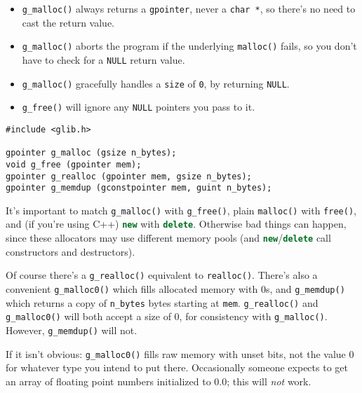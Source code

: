 \begin{itemize}
  \item \lstinline{g_malloc()} always returns a \lstinline{gpointer}, never a \lstinline{char *}, so there's no need to cast the return value.

  \item \lstinline{g_malloc()} aborts the program if the underlying \lstinline{malloc()} fails, so you don't have to check for a \lstinline{NULL} return value.

  \item \lstinline{g_malloc()} gracefully handles a \lstinline{size} of \lstinline{0}, by returning \lstinline{NULL}.

  \item \lstinline{g_free()} will ignore any \lstinline{NULL} pointers you pass to it.
\end{itemize}

\begin{lstlisting}[float, caption={GLib memory allocation}, label=glib-malloc-free]
#include <glib.h>

gpointer g_malloc (gsize n_bytes);
void g_free (gpointer mem);
gpointer g_realloc (gpointer mem, gsize n_bytes);
gpointer g_memdup (gconstpointer mem, guint n_bytes);
\end{lstlisting}

It's important to match \lstinline{g_malloc()} with \lstinline{g_free()}, plain \lstinline{malloc()} with \lstinline{free()}, and (if you're using C++) \lstinline[language=C++]{new} with \lstinline[language=C++]{delete}. Otherwise bad things can happen, since these allocators may use different memory pools (and \lstinline[language=C++]{new}/\lstinline[language=C++]{delete} call constructors and destructors).

Of course there's a \lstinline{g_realloc()} equivalent to \lstinline{realloc()}. There's also a convenient \lstinline{g_malloc0()} which fills allocated memory with 0s, and \lstinline{g_memdup()} which returns a copy of \lstinline{n_bytes} bytes starting at \lstinline{mem}. \lstinline{g_realloc()} and \lstinline{g_malloc0()} will both accept a size of 0, for consistency with \lstinline{g_malloc()}. However, \lstinline{g_memdup()} will not.

If it isn't obvious: \lstinline{g_malloc0()} fills raw memory with unset bits, not the value 0 for whatever type you intend to put there. Occasionally someone expects to get an array of floating point numbers initialized to 0.0; this will \emph{not} work.

